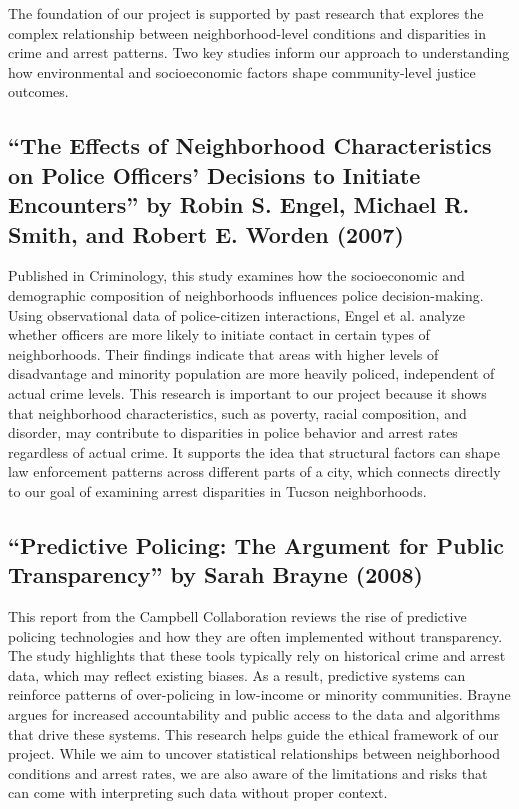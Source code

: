 \documentclass{report}
\begin{document}
	The foundation of our project is supported by past research that explores the complex relationship between neighborhood-level conditions and disparities in crime and arrest patterns. Two key studies inform our approach to understanding how environmental and socioeconomic factors shape community-level justice outcomes.
	\subsection{“The Effects of Neighborhood Characteristics on Police Officers’ Decisions to Initiate Encounters” by Robin S. Engel, Michael R. Smith, and Robert E. Worden (2007)}
	Published in Criminology, this study examines how the socioeconomic and demographic composition of neighborhoods influences police decision-making. Using observational data of police-citizen interactions, Engel et al. analyze whether officers are more likely to initiate contact in certain types of neighborhoods. Their findings indicate that areas with higher levels of disadvantage and minority population are more heavily policed, independent of actual crime levels. This research is important to our project because it shows that neighborhood characteristics, such as poverty, racial composition, and disorder, may contribute to disparities in police behavior and arrest rates regardless of actual crime. It supports the idea that structural factors can shape law enforcement patterns across different parts of a city, which connects directly to our goal of examining arrest disparities in Tucson neighborhoods.
	
	\subsection{“Predictive Policing: The Argument for Public Transparency” by Sarah Brayne (2008)}
	This report from the Campbell Collaboration reviews the rise of predictive policing technologies and how they are often implemented without transparency. The study highlights that these tools typically rely on historical crime and arrest data, which may reflect existing biases. As a result, predictive systems can reinforce patterns of over-policing in low-income or minority communities. Brayne argues for increased accountability and public access to the data and algorithms that drive these systems. This research helps guide the ethical framework of our project. While we aim to uncover statistical relationships between neighborhood conditions and arrest rates, we are also aware of the limitations and risks that can come with interpreting such data without proper context.
	
\end{document}
